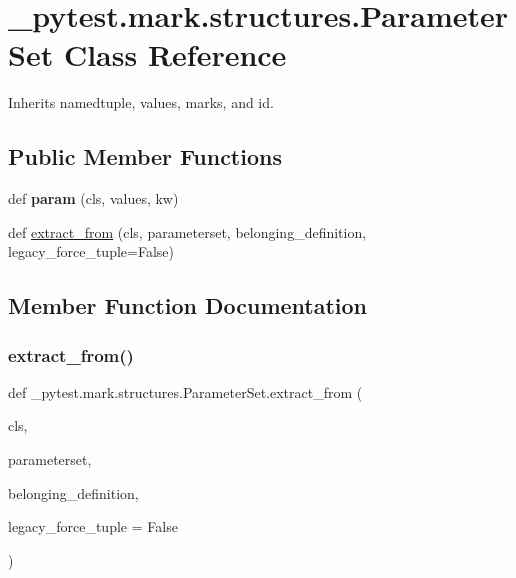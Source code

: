 \hypertarget{class__pytest_1_1mark_1_1structures_1_1_parameter_set}{}\section{\+\_\+pytest.\+mark.\+structures.\+Parameter\+Set Class Reference}
\label{class__pytest_1_1mark_1_1structures_1_1_parameter_set}


Inherits namedtuple, values, marks, and id.

\subsection*{Public Member Functions}
\begin{DoxyCompactItemize}
\item 
\mbox{\label{class__pytest_1_1mark_1_1structures_1_1_parameter_set_a044700232186fc4308654212e6327ad0}} 
def {\bfseries param} (cls, values, kw)
\item 
def \hyperlink{class__pytest_1_1mark_1_1structures_1_1_parameter_set_a31b83e11dbd42616b85f580dbde7f63b}{extract\+\_\+from} (cls, parameterset, belonging\+\_\+definition, legacy\+\_\+force\+\_\+tuple=False)
\end{DoxyCompactItemize}


\subsection{Member Function Documentation}
\mbox{\label{class__pytest_1_1mark_1_1structures_1_1_parameter_set_a31b83e11dbd42616b85f580dbde7f63b}} 
\subsubsection{\texorpdfstring{extract\+\_\+from()}{extract\_from()}}
{\footnotesize\ttfamily def \+\_\+pytest.\+mark.\+structures.\+Parameter\+Set.\+extract\+\_\+from (\begin{DoxyParamCaption}\item[{}]{cls,  }\item[{}]{parameterset,  }\item[{}]{belonging\+\_\+definition,  }\item[{}]{legacy\+\_\+force\+\_\+tuple = {\ttfamily False} }\end{DoxyParamCaption})}


